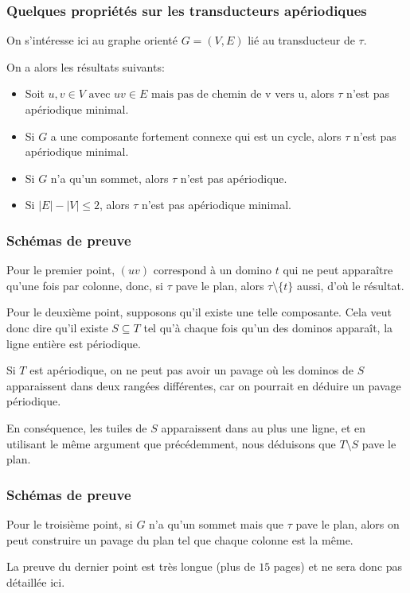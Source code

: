 \documentclass{beamer}
\renewcommand{\le}{\leqslant}
\newcommand{\sube}{\subseteq}
\begin{document}
\begin{frame}
\frametitle{Quelques propriétés sur les transducteurs apériodiques}

On s'intéresse ici au graphe orienté $G = (V,E)$ lié au transducteur de $\tau$.

On a alors les résultats suivants:

\begin{itemize}
    \item Soit $u,v \in V \text{ avec } uv \in E \text{ mais pas de chemin de v vers u}$, alors $\tau$ n'est pas apériodique minimal.
    \item Si $G$ a une composante fortement connexe qui est un cycle, alors $\tau$ n'est pas apériodique minimal.
    \item Si $G$ n'a qu'un sommet, alors $\tau$ n'est pas apériodique.
    \item Si $|E|-|V| \le 2$, alors $\tau$ n'est pas apériodique minimal.
\end{itemize}

\end{frame}

\begin{frame}
\frametitle{Schémas de preuve}

Pour le premier point, $(uv)$ correspond à un domino $t$ qui ne peut apparaître qu'une fois par colonne,
donc, si $\tau$ pave le plan, alors $\tau \setminus \{t \}$ aussi, d'où le résultat.

\;

Pour le deuxième point, supposons qu'il existe une telle composante. Cela veut donc dire qu'il existe $S \sube T$
tel qu'à chaque fois qu'un des dominos apparaît, la ligne entière est périodique.

Si $T$ est apériodique, on ne peut pas avoir un pavage où les dominos de $S$ apparaissent dans deux rangées différentes, car on pourrait en déduire un pavage périodique.

En conséquence, les tuiles de $S$ apparaissent dans au plus une ligne, et en utilisant le même argument que précédemment, nous déduisons que $T \setminus S$ pave le plan.


\end{frame}

\begin{frame}
\frametitle{Schémas de preuve}

    Pour le troisième point, si $G$ n'a qu'un sommet mais que $\tau$ pave le plan, alors on peut construire un pavage
    du plan tel que chaque colonne est la même.
    
    \;
    
    La preuve du dernier point est très longue (plus de $15$ pages) et ne sera donc pas détaillée ici.
\end{frame}
\end{document}
